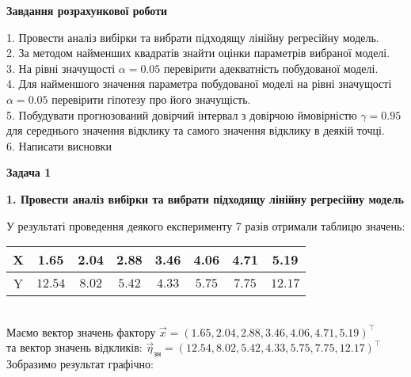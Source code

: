 \documentclass[12 pt]{article}
\begin{document}
\begin{center}
    \large
    \textbf{Завдання розрахункової роботи}
\end{center}
1. Провести аналіз вибірки та вибрати підходящу лінійну регресійну модель. \\
2. За методом найменших квадратів знайти оцінки параметрів вибраної моделі. \\
3. На рівні значущості $\alpha=0.05$ перевірити адекватність побудованої моделі. \\ 
4. Для найменшого значення параметра побудованої моделі на рівні значущості $\alpha=0.05$  
перевірити гіпотезу про його значущість. \\ 
5. Побудувати прогнозований довірчий інтервал з довірчою ймовірністю $\gamma=0.95$ 
для середнього значення відклику та самого значення відклику в деякій точці. \\ 
6. Написати висновки
\begin{center}
    \Large
    \textbf{Задача 1}
\end{center}
\begin{center}
    \textbf{1. Провести аналіз вибірки та вибрати підходящу лінійну регресійну модель}
\end{center}
У результаті проведення деякого експерименту 7 разів отримали таблицю значень: \\ 
\begin{tabular}{|c|c|c|c|c|c|c|c|}\hline
    X & 1.65 & 2.04 & 2.88 & 3.46 & 4.06 & 4.71 & 5.19
    \\ \hline
    Y &$12.54$&$8.02$&$5.42$&$4.33$&$5.75$&$7.75$&$12.17$ \\ \hline
\end{tabular} \\ 
Маємо вектор значень фактору $\vec{x} = (1.65,2.04,2.88,3.46,4.06,4.71,5.19)^\top$ \\ 
та вектор значень відкликів: $\vec{\eta}_{\text{зн}} = (12.54,8.02,5.42,4.33,5.75,7.75,12.17)^\top$ \\ 
Зобразимо результат графічно:\\ 
\begin{center}
\end{center}
\end{document}
